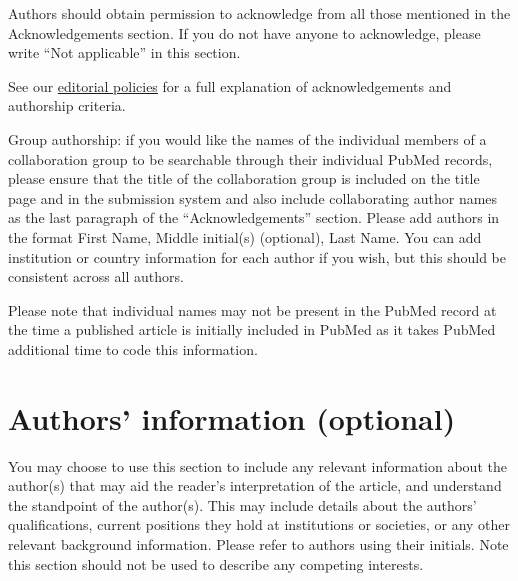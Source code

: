 \documentclass[a4paper,num-refs]{oup-contemporary}
\begin{document}
Authors should obtain permission to acknowledge from all those mentioned in the Acknowledgements section. If you do not have anyone to acknowledge, please write ``Not applicable'' in this section.

See our \href{https://academic.oup.com/gigascience/pages/editorial_policies_and_reporting_standards}{editorial policies} for a full explanation of acknowledgements and authorship criteria.

Group authorship: if you would like the names of the individual members of a collaboration group to be searchable through their individual PubMed records, please ensure that the title of the collaboration group is included on the title page and in the submission system and also include collaborating author names as the last paragraph of the “Acknowledgements” section. Please add authors in the format First Name, Middle initial(s) (optional), Last Name. You can add institution or country information for each author if you wish, but this should be consistent across all authors.

Please note that individual names may not be present in the PubMed record at the time a published article is initially included in PubMed as it takes PubMed additional time to code this information.

\section{Authors' information (optional)}

You may choose to use this section to include any relevant information about the author(s) that may aid the reader's interpretation of the article, and understand the standpoint of the author(s). This may include details about the authors' qualifications, current positions they hold at institutions or societies, or any other relevant background information. Please refer to authors using their initials. Note this section should not be used to describe any competing interests.




\end{document}
